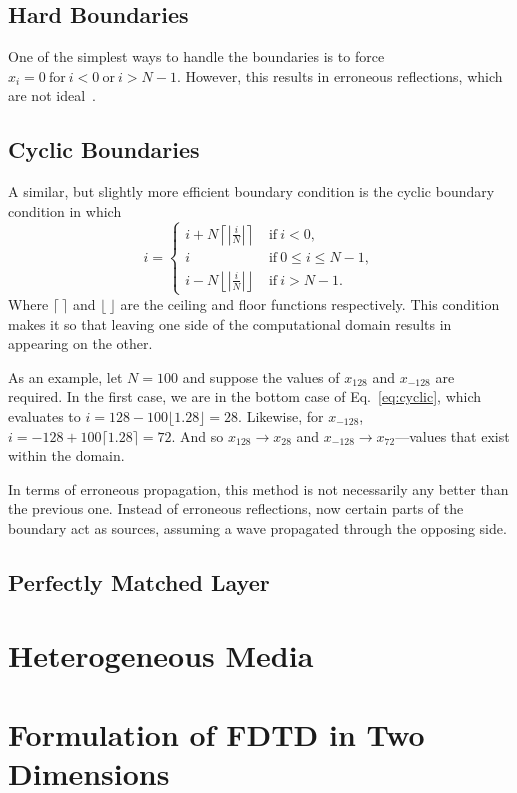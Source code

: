 \documentclass[12pt,twocolumn]{article}
\begin{document}
\subsection{Hard Boundaries}
One of the simplest ways to handle the boundaries is to force ${x_i=0~\mathrm{for}~i<0~\mathrm{or}~i>N-1}$. However, this results in erroneous reflections, which are not ideal~\cite{Sullivan00}.
\subsection{Cyclic Boundaries}
A similar, but slightly more efficient boundary condition is the cyclic boundary condition in which
\begin{equation}
\label{eq:cyclic}
i=\begin{cases}
i+N\left\lceil\left|{\frac{i}{N}}\right|\right\rceil~&\mathrm{if}~i<0,\\
i~&\mathrm{if}~0\leq i\leq N-1,\\
i-N\left\lfloor\left|{\frac{i}{N}}\right|\right\rfloor~&\mathrm{if}~i>N-1.
\end{cases}
\end{equation}
Where $\lceil~\rceil$ and $\lfloor~\rfloor$ are the ceiling and floor functions respectively. This condition makes it so that leaving one side of the computational domain results in appearing on the other.

As an example, let $N=100$ and suppose the values of $x_{128}$ and $x_{-128}$ are required. In the first case, we are in the bottom case of Eq.~\ref{eq:cyclic}, which evaluates to $i=128-100\lfloor 1.28 \rfloor=28$. Likewise, for $x_{-128}$, $i=-128+100\lceil1.28\rceil=72$. And so $x_{128}\rightarrow x_{28}$ and $x_{-128}\rightarrow x_{72}$---values that exist within the domain.

In terms of erroneous propagation, this method is not necessarily any better than the previous one. Instead of erroneous reflections, now certain parts of the boundary act as sources, assuming a wave propagated through the opposing side.
\subsection{Perfectly Matched Layer}

\section{Heterogeneous Media}

\section{Formulation of FDTD in Two Dimensions}
\end{document}
